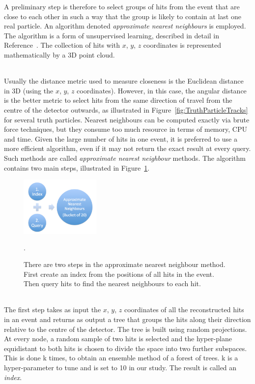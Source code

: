 A preliminary step is therefore to select groups of hits from the event that are close to each other in such a way that the group is likely to contain at last one real particle. An algorithm denoted \emph{approximate nearest neighbours} is employed. The algorithm is a form of unsupervised learning, described in detail in Reference~\cite{BucketCreation}. The collection of hits with $x$, $y$, $z$ coordinates is represented mathematically by a 3D point cloud.

\ \\Usually the distance metric used to measure closeness is the Euclidean distance in 3D (using the $x$, $y$, $z$ coordinates). However, in this case, the angular distance is the better metric to select hits from the same direction of travel from the centre of the detector outwards, as illustrated in Figure~\ref{fig:TruthParticleTracks} for several truth particles. Nearest neighbours can be computed exactly via brute force techniques, but they consume too much resource in terms of memory, CPU and time. Given the large number of hits in one event, it is preferred to use a more efficient algorithm, even if it may not return the exact result at every query. Such methods are called \emph{approximate nearest neighbour} methods. The algorithm contains two main steps, illustrated in Figure~\ref{fig:ApproximateNearestNeighbours}.

\begin{figure}[htb]
\centering
\includegraphics[width=0.35\textwidth]{./plots/ApproximateNearestNeighbours.jpeg}
\caption{There are two steps in the approximate nearest neighbour method. First create an index from the positions of all hits in the event. Then query hits to find the nearest neighbours to each hit.}
\label{fig:ApproximateNearestNeighbours}.
\end{figure}

\ \\The first step takes as input the $x$, $y$, $z$ coordinates of all the reconstructed hits in an event and returns as output a tree that groups the hits along their direction relative to the centre of the detector. The tree is built using random projections. At every node, a random sample of two hits is selected and the hyper-plane equidistant to both hits is chosen to divide the space into two further subspaces. This is done k times, to obtain an ensemble method of a forest of trees. k is a hyper-parameter to tune and is set to 10 in our study. The result is called an \emph{index}. 

